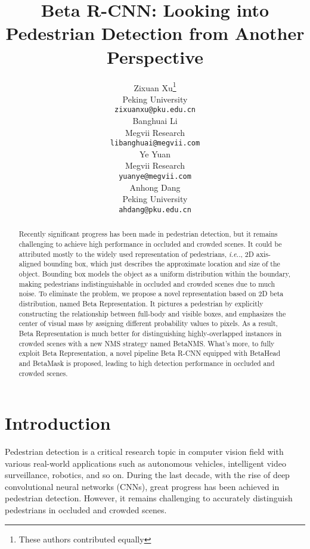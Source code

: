 \documentclass{article}
\title{Beta R-CNN: Looking into Pedestrian Detection from Another Perspective}
\author{Zixuan Xu\thanks{These authors contributed equally}\\
Peking University\\
  \texttt{zixuanxu@pku.edu.cn} \\
\And
  Banghuai Li \samethanks[1] \\
  Megvii Research \\
  \texttt{libanghuai@megvii.com} \\
   \AND
   Ye Yuan \\
   Megvii Research \\
   \texttt{yuanye@megvii.com} \\
   \And
   Anhong Dang \\
   Peking University \\
   \texttt{ahdang@pku.edu.cn} \\
}
\makeatletter
\DeclareRobustCommand\onedot{\futurelet\@let@token\@onedot}
\def\@onedot{\ifx\@let@token.\else.\null\fi\xspace}
\def\ie{\emph{i.e}\onedot} \def\Ie{\emph{I.e}\onedot}
\makeatother
\begin{document}
\maketitle

\begin{abstract}
Recently significant progress has been made in pedestrian detection, but it remains challenging to achieve high performance in occluded and crowded scenes. 
It could be attributed mostly to the widely used representation of pedestrians, \ie, 2D axis-aligned bounding box, which just describes the approximate location and size of the object.
Bounding box models the object as a uniform distribution within the boundary, making pedestrians indistinguishable in occluded  and crowded scenes due to much noise.
To eliminate the problem, we propose a novel representation based on 2D beta distribution, named Beta Representation.
It pictures a pedestrian by explicitly constructing the relationship between full-body and visible boxes, and emphasizes the center of visual mass by assigning different probability values to pixels.
As a result, Beta Representation is much better for distinguishing highly-overlapped instances in crowded scenes with a new NMS strategy named BetaNMS.
What's more, to fully exploit Beta Representation, a novel pipeline Beta R-CNN equipped with BetaHead and BetaMask is proposed, leading to high detection performance in occluded and crowded scenes. 



\end{abstract}

\section{Introduction}
Pedestrian detection is a critical research topic in computer vision field with various real-world applications such as autonomous vehicles, intelligent video surveillance, robotics, and so on.
During the last decade, with the rise of deep convolutional neural networks (CNNs), great progress has been achieved in pedestrian detection. 
However, it remains challenging to accurately distinguish pedestrians in occluded and crowded scenes.
\end{document}
